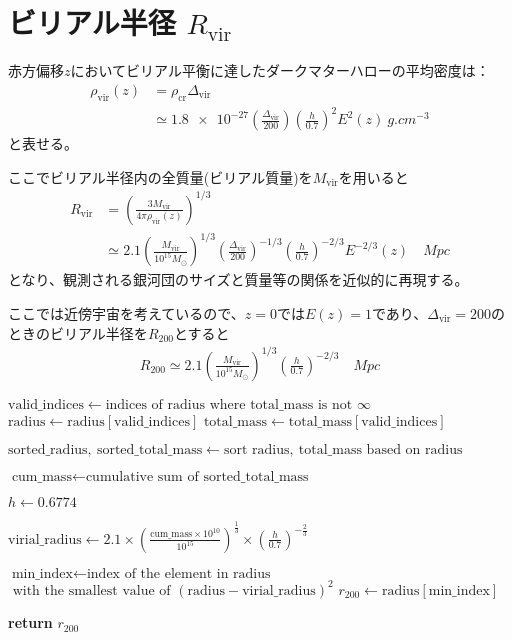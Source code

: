 \section{ビリアル半径 $R_\text{vir}$}

赤方偏移$z$においてビリアル平衡に達したダークマターハローの平均密度は：
\begin{align}
	\rho_\text{vir}(z) &= \rho_\text{cr} \Delta_\text{vir} \\
	&\simeq \num{1.8e-27} \left( \frac{\Delta_\text{vir}}{200}\right) \left(\frac{h}{0.7}\right)^2 E^2(z) \ \si{g. cm^{-3}}
\end{align}
と表せる。

ここでビリアル半径内の全質量(ビリアル質量)を$M_\text{vir}$を用いると
\begin{align}
	R_\text{vir} &= \left( \frac{3 M_\text{vir}}{4 \pi \rho_\text{vir}(z)} \right)^{1/3} \\
	&\simeq 2.1 \left( \frac{M_\text{vir}}{10^{15} M_\odot} \right)^{1/3} \left( \frac{\Delta_\text{vir}}{200} \right)^{-1/3} \left( \frac{h}{0.7} \right)^{-2/3} E^{-2/3}(z) \quad \si{Mpc}
\end{align}
となり、観測される銀河団のサイズと質量等の関係を近似的に再現する。

ここでは近傍宇宙を考えているので、$z=0$では$E(z) = 1$であり、$\Delta_\text{vir} = 200$のときのビリアル半径を$R_{200}$とすると
\begin{align}
	R_{200} \simeq 2.1 \left( \frac{M_\text{vir}}{10^{15} M_\odot} \right)^{1/3} \left( \frac{h}{0.7} \right)^{-2/3} \quad \si{Mpc}
\end{align}

\begin{algorithmic}
	\State $\text{valid\_indices} \gets \text{indices of } \text{radius} \text{ where } \text{total\_mass} \text{ is not } \infty$
	\State $\text{radius} \gets \text{radius}[ \text{valid\_indices}]$
	\State $\text{total\_mass} \gets \text{total\_mass}[ \text{valid\_indices}]$
	
	\State $\text{sorted\_radius}, \ \text{sorted\_total\_mass} \gets \text{sort } \text{radius}, \ \text{total\_mass} \text{ based on } \text{radius}$
	
	\State $\text{cum\_mass} \gets \text{cumulative sum of } \text{sorted\_total\_mass}$
	
	\State $h \gets 0.6774$
	
	\State $\text{virial\_radius} \gets 2.1 \times \left(\frac{\text{cum\_mass} \times 10^{10}}{10^{15}}\right)^{\frac{1}{3}} \times \left(\frac{h}{0.7}\right)^{-\frac{2}{3}}$
	
	\State $\text{min\_index} \gets \text{index of the element in } \text{radius}$ \\
	\qquad \qquad \qquad \qquad \qquad$\text{ with the smallest value of } (\text{radius} - \text{virial\_radius})^2$
	\State $ r_{200} \gets \text{radius}[\text{min\_index}]$
	
	\State \textbf{return} $r_{200}$
	\EndFunction
\end{algorithmic}